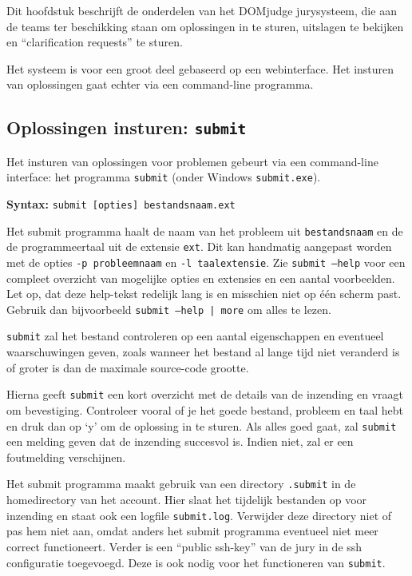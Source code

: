 \documentclass[11pt,titlepage,a4paper]{article}
\newcommand{\DOMjudge}{DOMjudge }
\begin{document}
Dit hoofdstuk beschrijft de onderdelen van het \DOMjudge
jurysysteem, die aan de teams ter beschikking staan om oplossingen in
te sturen, uitslagen te bekijken en ``clarification requests'' te
sturen.

Het systeem is voor een groot deel gebaseerd op een webinterface. Het
insturen van oplossingen gaat echter via een command-line programma.

\subsection{Oplossingen insturen: \texttt{submit}}\label{submit}

Het insturen van oplossingen voor problemen gebeurt via een
command-line interface: het programma \texttt{submit} (onder Windows
\texttt{submit.exe}).

\textbf{Syntax:} \texttt{submit [opties] bestandsnaam.ext}

Het submit programma haalt de naam van het probleem uit
\texttt{bestandsnaam} en de de programmeertaal uit de extensie
\texttt{ext}. Dit kan handmatig aangepast worden met de opties
\texttt{-p probleemnaam} en \texttt{-l taalextensie}. Zie
\texttt{submit --help} voor een compleet overzicht van mogelijke
opties en extensies en een aantal voorbeelden. Let op, dat deze help-tekst
redelijk lang is en misschien niet op \'e\'en scherm past. Gebruik dan
bijvoorbeeld \texttt{submit --help | more} om alles te lezen.

\texttt{submit} zal het bestand controleren op een aantal eigenschappen
en eventueel waarschuwingen geven, zoals wanneer het bestand al lange
tijd niet veranderd is of groter is dan de maximale source-code grootte.

Hierna geeft \texttt{submit} een kort overzicht met de details van de
inzending en vraagt om bevestiging. Controleer vooral of je het goede
bestand, probleem en taal hebt en druk dan op `y' om de oplossing in
te sturen. Als alles goed gaat, zal \texttt{submit} een melding geven
dat de inzending succesvol is. Indien niet, zal er een foutmelding
verschijnen.

Het submit programma maakt gebruik van een directory \texttt{.submit}
in de homedirectory van het account. Hier slaat het tijdelijk
bestanden op voor inzending en staat ook een logfile \texttt{submit.log}.
Verwijder deze directory niet of pas hem niet aan, omdat anders het
submit programma eventueel niet meer correct functioneert. Verder
is een ``public ssh-key'' van de jury in de ssh configuratie
toegevoegd. Deze is ook nodig voor het functioneren van \texttt{submit}.
 
\end{document}
